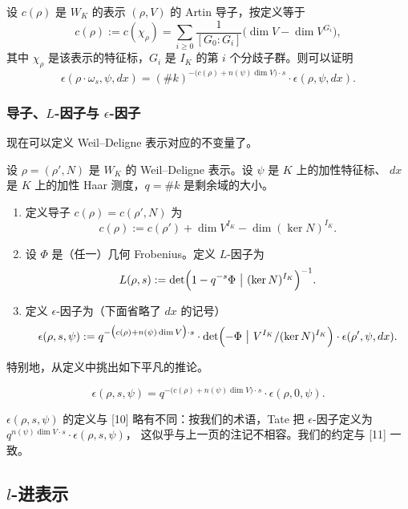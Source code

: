 \begin{remark}
设 $c(\rho)$ 是 $W_K$ 的表示 $(\rho,V)$ 的 Artin 导子，按定义等于
\[
c(\rho):=c(\chi_{\rho})=\sum_{i\ge 0}\frac{1}{[G_0:G_i]}\bigl(\dim V-\dim V^{G_i}\bigr),
\]
其中 $\chi_{\rho}$ 是该表示的特征标，$G_i$ 是 $I_K$ 的第 $i$ 个分歧子群。则可以证明
\[
\epsilon(\rho\cdot\omega_s,\psi,dx)=(\#k)^{-\bigl(c(\rho)+n(\psi)\dim V\bigr)\cdot s}\cdot
\epsilon(\rho,\psi,dx).
\]
\end{remark}

\subsubsection{导子、$L$-因子与 $\epsilon$-因子}

现在可以定义 Weil--Deligne 表示对应的不变量了。

\begin{definition}
设 $\rho=(\rho',N)$ 是 $W_K$ 的 Weil--Deligne 表示。设 $\psi$ 是 $K$ 上的加性特征标、
$dx$ 是 $K$ 上的加性 Haar 测度，$q=\#k$ 是剩余域的大小。
\begin{enumerate}[label=(\arabic*),leftmargin=2.2em]
\item 定义导子 $c(\rho)=c(\rho',N)$ 为
\[
c(\rho):=c(\rho')+\dim V^{I_K}-\dim(\ker N)^{I_K}.
\]
\item 设 $\Phi$ 是（任一）几何 Frobenius。定义 $L$-因子为
\[
L(\rho,s):=\det\Bigl(1-q^{-s}\Phi\ \big|\ (\ker N)^{I_K}\Bigr)^{-1}.
\]
\item 定义 $\epsilon$-因子为（下面省略了 $dx$ 的记号）
\[
\epsilon(\rho,s,\psi):=q^{-\bigl(c(\rho)+n(\psi)\dim V\bigr)\cdot s}\cdot
\det\Bigl(-\Phi\ \big|\ V^{I_K}/(\ker N)^{I_K}\Bigr)\cdot\epsilon(\rho',\psi,dx).
\]
\end{enumerate}
\end{definition}

特别地，从定义中挑出如下平凡的推论。

\begin{corollary}
\[
\epsilon(\rho,s,\psi)=q^{-\bigl(c(\rho)+n(\psi)\dim V\bigr)\cdot s}\cdot\epsilon(\rho,0,\psi).
\]
\end{corollary}

\begin{remark}
$\epsilon(\rho,s,\psi)$ 的定义与 [10] 略有不同：按我们的术语，Tate 把
$\epsilon$-因子定义为 $q^{n(\psi)\dim V\cdot s}\cdot\epsilon(\rho,s,\psi)$，
这似乎与上一页的注记不相容。我们的约定与 [11] 一致。
\end{remark}

\subsection{$l$-进表示}

